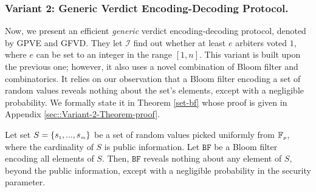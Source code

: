 \subsubsection{Variant 2: Generic Verdict  Encoding-Decoding Protocol.} Now, we present  an efficient \emph{generic} verdict  encoding-decoding protocol, denoted by GPVE and GFVD. They   let $\mathcal{I}$ find out whether at least $e$ arbiters voted $1$, where $e$ can be set to an integer in the range $[1, n]$. This variant is  built upon the previous one;  however, it also uses a novel combination of   Bloom filter and combinatorics. It  relies on our observation that a Bloom filter  encoding a set of random values reveals nothing about the set's elements, except with a negligible probability. We formally state it in Theorem \ref{set-bf} whose proof is given in Appendix \ref{sec::Variant-2-Theorem-proof}. 




\begin{theorem}\label{set-bf}
Let set $S=\{s_{\scriptscriptstyle 1},..., s_{\scriptscriptstyle m}\}$ be a set of random values picked uniformly from $\mathbb{F}_{\scriptscriptstyle p}$, where the cardinality of $S$ is  public information. Let $\mathtt{BF}$ be a Bloom filter encoding all elements of   $S$. Then,  $\mathtt{BF}$ reveals nothing about any element of $S$, beyond the public information, except with a negligible probability in the security parameter. 
\end{theorem}

%
%


